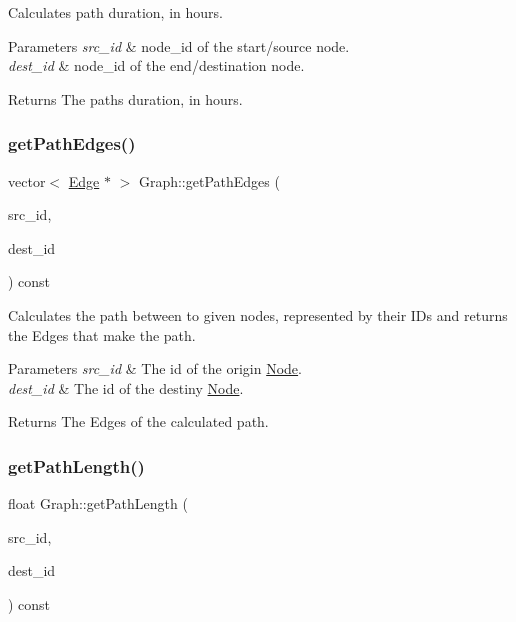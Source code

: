 Calculates path duration, in hours.


\begin{DoxyParams}{Parameters}
{\em src\+\_\+id} & node\+\_\+id of the start/source node. \\
\hline
{\em dest\+\_\+id} & node\+\_\+id of the end/destination node.\\
\hline
\end{DoxyParams}
\begin{DoxyReturn}{Returns}
The path\textquotesingle{}s duration, in hours. 
\end{DoxyReturn}
\hypertarget{class_graph_a94db80dbb52cac57e2b5d14c53e649e7}{}\label{class_graph_a94db80dbb52cac57e2b5d14c53e649e7} 
\subsubsection{\texorpdfstring{get\+Path\+Edges()}{getPathEdges()}}
{\footnotesize\ttfamily vector$<$ \hyperlink{class_edge}{Edge} $\ast$ $>$ Graph\+::get\+Path\+Edges (\begin{DoxyParamCaption}\item[{\hyperlink{_node_8hpp_a9d6265804805c2375068fd7484840dc6}{node\+\_\+id}}]{src\+\_\+id,  }\item[{\hyperlink{_node_8hpp_a9d6265804805c2375068fd7484840dc6}{node\+\_\+id}}]{dest\+\_\+id }\end{DoxyParamCaption}) const}

Calculates the path between to given nodes, represented by their I\+Ds and returns the Edges that make the path.


\begin{DoxyParams}{Parameters}
{\em src\+\_\+id} & The id of the origin \hyperlink{class_node}{Node}. \\
\hline
{\em dest\+\_\+id} & The id of the destiny \hyperlink{class_node}{Node}.\\
\hline
\end{DoxyParams}
\begin{DoxyReturn}{Returns}
The Edges of the calculated path. 
\end{DoxyReturn}
\hypertarget{class_graph_adb19e47c0238b012a6a3a28bdaf855f8}{}\label{class_graph_adb19e47c0238b012a6a3a28bdaf855f8} 
\subsubsection{\texorpdfstring{get\+Path\+Length()}{getPathLength()}}
{\footnotesize\ttfamily float Graph\+::get\+Path\+Length (\begin{DoxyParamCaption}\item[{\hyperlink{_node_8hpp_a9d6265804805c2375068fd7484840dc6}{node\+\_\+id}}]{src\+\_\+id,  }\item[{\hyperlink{_node_8hpp_a9d6265804805c2375068fd7484840dc6}{node\+\_\+id}}]{dest\+\_\+id }\end{DoxyParamCaption}) const}

